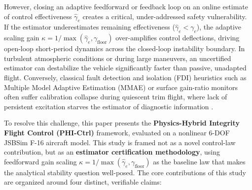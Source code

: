 \documentclass[review,12pt]{elsarticle}
\begin{document}
However, closing an adaptive feedforward or feedback loop on an online estimate of control effectiveness $\hat{\gamma}_e$ creates a critical, under-addressed safety vulnerability. If the estimator underestimates remaining effectiveness ($\hat{\gamma}_e < \gamma_e$), the adaptive scaling gain $\kappa = 1/\max(\hat{\gamma}_e, \gamma_{\text{floor}})$ over-amplifies control deflections, driving open-loop short-period dynamics across the closed-loop instability boundary. In turbulent atmospheric conditions or during large maneuvers, an uncertified estimator can destabilize the vehicle significantly faster than passive, unadapted flight. Conversely, classical fault detection and isolation (FDI) heuristics such as Multiple Model Adaptive Estimation (MMAE) or surface gain-ratio monitors often suffer calibration collapse during quiescent trim flight, where lack of persistent excitation starves the estimator of diagnostic information \cite{Maybeck1999, Cobleigh1997, Bosworth1992}.

To resolve this challenge, this paper presents the \textbf{Physics-Hybrid Integrity Flight Control (PHI-Ctrl)} framework, evaluated on a nonlinear 6-DOF JSBSim F-16 aircraft model. This study is framed not as a novel control-law contribution, but as an \textbf{estimator certification methodology}, using feedforward gain scaling $\kappa = 1/\max(\hat{\gamma}_e, \gamma_{\text{floor}})$ as the baseline law that makes the analytical stability question well-posed. The core contributions of this study are organized around four distinct, verifiable claims:
\end{document}
